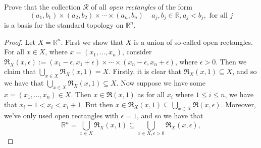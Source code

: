 \documentclass[10pt,reqno]{amsart}
\theoremstyle{definition}
\newcommand{\rr}{\mathbb R}
\begin{document}
\begin{tcolorbox}[colback=black!5!white,colframe=black!75!black,title= Chapter 3 $\S3.2$: Exercise 3.2.] Prove that the collection $\mathcal R$ of all \textit{open rectangles} of the form \[ (a_1, b_1) \times (a_2, b_2) \times \cdots \times (a_n, b_n) \; \; \; \; a_j, b_j \in \rr, a_j < b_j, \text{ for all $j$}
\] is a basis for the standard topology on $\rr^n$. 
\tcblower 	
\begin{proof} Let $X = \rr^n$. First we show that $X$ is a union of so-called open rectangles. For all $x \in X$, where $x= (x_1, \ldots, x_n)$, consider $\mathfrak R_X (x, \epsilon) := (x_1-\epsilon, x_1 + \epsilon) \times \cdots \times (x_n - \epsilon, x_n + \epsilon)$, where $\epsilon > 0$. Then we claim that $\bigcup _{x \in X} \mathfrak R_X (x, 1) = X$. Firstly, it is clear that $\mathfrak R_X(x, 1) \subseteq X$, and so we have that $\bigcup _{x \in X} \mathfrak R_X (x, 1) \subseteq X$. Now suppose we have some $x=(x_1, \ldots ,x_n) \in X$. Then $x \in \mathfrak R (x, 1)$ as for all $x_i$ where $1 \leq i \leq n$, we have that $x_i -1 < x_i < x_i + 1$. But then $x \in \mathfrak R_X(x, 1) \subseteq \bigcup_{x \in X} \mathfrak R (x, \epsilon)$. Moreover, we've only used open rectangles with $\epsilon = 1$, and so we have that 
\[
\rr^n = \bigcup_{x \in X} \mathfrak R_X(x, 1) \subseteq \bigcup_{x \in X, \epsilon>0} \mathfrak R_X(x,\epsilon),
\]
\end{proof}
\end{tcolorbox}
\end{document}
